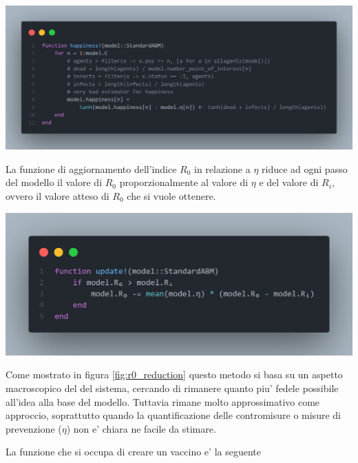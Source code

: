 \begin{minipage}{\linewidth}
	\centering
	\includegraphics[width=\textwidth]{img/happiness.png}
	\label{fig:happiness}
\end{minipage}

La funzione di aggiornamento dell'indice $R_0$ in relazione a $\eta$ riduce ad ogni passo 
del modello il valore di $R_0$ proporzionalmente al valore di $\eta$ e del
valore di $R_i$, ovvero il valore atteso di $R_0$ che si vuole ottenere. 

\begin{minipage}{\linewidth}
	\centering
	\includegraphics[width=\textwidth]{img/r0_reduction.png}
	\label{fig:r0_reduction}
\end{minipage}

Come mostrato in figura \ref{fig:r0_reduction} questo metodo si basa su un aspetto macroscopico del
del sistema, cercando di rimanere quanto piu' fedele possibile all'idea alla base 
del modello. Tuttavia rimane molto approssimativo come approccio, soprattutto quando la 
quantificazione delle contromisure o misure di prevenzione ($\eta$) non e' 
chiara ne facile da stimare.

La funzione che si occupa di creare un vaccino e' la seguente

